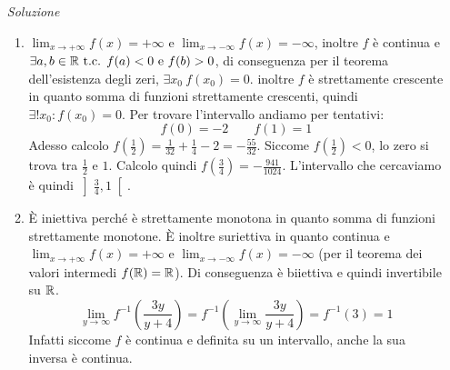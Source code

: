 \documentclass{article}
\begin{document}
\begin{enumerate}[label=\textbf{Esercizio 6.\arabic*.},itemindent=*]
\begin{enumerate}
\end{enumerate}
\item[\textit{\large Soluzione~}]~ 
    \begin{enumerate}
        \item $\lim_{x\to+\infty}f(x)=+\infty$ e $\lim_{x\to-\infty}f(x)=-\infty$, inoltre $f$ è continua e $\exists a,b\in \mathbb{R} \text{ t.c. } f(a)<0 ~ \text{e}~f(b)>0$, di conseguenza per il teorema dell'esistenza degli zeri, $\exists x_0\:f(x_0)=0$. inoltre $f$ è strettamente crescente in quanto somma di funzioni strettamente crescenti, quindi $\exists!x_0:f(x_0)=0$. Per trovare l'intervallo andiamo per tentativi:
        \[f(0)=-2~~~~~~~~~f(1)=1\]
        Adesso calcolo $f\left( \frac{1}{2} \right)=\frac{1}{32}+\frac{1}{4}-2=-\frac{55}{32}$. Siccome $f\left( \frac{1}{2} \right)<0$, lo zero si trova tra $\frac{1}{2}$ e $1$. Calcolo quindi $f\left( \frac{3}{4} \right)=-\frac{941}{1024}$. L'intervallo che cercaviamo è quindi $\left]\frac{3}{4},1 \right[$.
        \item È iniettiva perché è strettamente monotona in quanto somma di funzioni strettamente monotone. È inoltre suriettiva in quanto continua e $\lim_{x\to+\infty}f(x)=+\infty$ e $\lim_{x\to-\infty}f(x)=-\infty$ (per il teorema dei valori intermedi $f(\mathbb{R})=\mathbb{R}$). Di conseguenza è biiettiva e quindi invertibile su $\mathbb{R}$.
        \[\lim_{y\to \infty}f^{-1}\left( \frac{3y}{y+4} \right)=f^{-1}\left( \lim_{y\to \infty}\frac{3y}{y+4} \right)=f^{-1}(3)=1\]
        Infatti siccome $f$ è continua e definita su un intervallo, anche la sua inversa è continua.
        
    \end{enumerate}
    

\end{enumerate}
\end{document}
